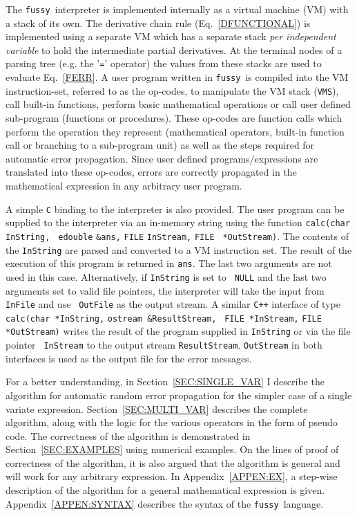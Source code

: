 \documentclass[12pt]{article}
\newcommand{\Fussy}{{\tt fussy}}
\newcommand{\VMS}{{\tt VMS}}
\begin{document}
The \Fussy\ interpreter is implemented internally as a virtual machine
(VM) with a stack of its own.  The derivative chain rule
(Eq.~\ref{DFUNCTIONAL}) is implemented using a separate VM which has a
separate stack {\it per independent variable} to hold the intermediate
partial derivatives.  At the terminal nodes of a parsing tree (e.g.
the '{\tt =}' operator) the values from these stacks are used to
evaluate Eq.~\ref{FERR}.  A user program written in \Fussy\ is
compiled into the VM instruction-set, referred to as the op-codes, to
manipulate the VM stack (\VMS), call built-in functions, perform basic
mathematical operations or call user defined sub-program (functions or
procedures).  These op-codes are function calls which perform the
operation they represent (mathematical operators, built-in function
call or branching to a sub-program unit) as well as the steps required
for automatic error propagation.  Since user defined
programs/expressions are translated into these op-codes, errors are
correctly propagated in the mathematical expression in any arbitrary
user program.

A simple {\tt C} binding to the interpreter is also provided.  The
user program can be supplied to the interpreter via an in-memory
string using the function {\tt calc(char} {\tt *InString,} {\tt
edouble} {\tt \&ans,} {\tt FILE} {\tt *InStream,} {\tt FILE} {\tt
*OutStream)}.  The contents of the {\tt InString} are parsed and
converted to a VM instruction set.  The result of the execution of
this program is returned in {\tt ans}.  The last two arguments are not
used in this case.  Alternatively, if {\tt InString} is set to {\tt
NULL} and the last two arguments set to valid file pointers, the
interpreter will take the input from {\tt InFile} and use {\tt
OutFile} as the output stream.  A similar {\tt C++} interface of type
{\tt calc(}{\tt char *InString,} {\tt ostream \&ResultStream,} {\tt
FILE *InStream,} {\tt FILE *OutStream)} writes the result of the
program supplied in {\tt InString} or via the file pointer {\tt
InStream} to the output stream {\tt ResultStream}.  {\tt OutStream} in
both interfaces is used as the output file for the error messages.

For a better understanding, in Section~\ref{SEC:SINGLE_VAR} I describe
the algorithm for automatic random error propagation for the simpler
case of a single variate expression.  Section~\ref{SEC:MULTI_VAR}
describes the complete algorithm, along with the logic for the various
operators in the form of pseudo code.  The correctness of the
algorithm is demonstrated in Section~\ref{SEC:EXAMPLES} using
numerical examples.  On the lines of proof of correctness of the
algorithm, it is also argued that the algorithm is general and will
work for any arbitrary expression.  In Appendix~\ref{APPEN:EX}, a
step-wise description of the algorithm for a general mathematical
expression is given.  Appendix~\ref{APPEN:SYNTAX} describes the syntax
of the \Fussy\ language.
\end{document}
